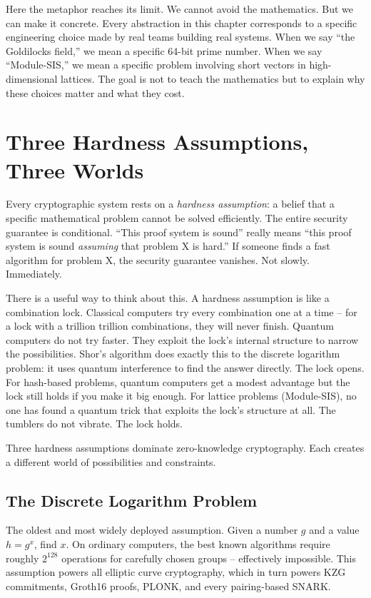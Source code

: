 \documentclass[
  11pt,
  openany]{report}
\begin{document}
Here the metaphor reaches its limit. We cannot avoid the mathematics. But we can
make it concrete. Every abstraction in this chapter corresponds to a specific
engineering choice made by real teams building real systems. When we say ``the
Goldilocks field,'' we mean a specific 64-bit prime number. When we say
``Module-SIS,'' we mean a specific problem involving short vectors in
high-dimensional lattices. The goal is not to teach the mathematics but to
explain why these choices matter and what they cost.

\section{Three Hardness Assumptions, Three
Worlds}\label{three-hardness-assumptions-three-worlds}

Every cryptographic system rests on a \emph{hardness assumption}: a belief that
a specific mathematical problem cannot be solved efficiently. The entire
security guarantee is conditional. ``This proof system is sound'' really means
``this proof system is sound \emph{assuming} that problem X is hard.'' If
someone finds a fast algorithm for problem X, the security guarantee vanishes.
Not slowly. Immediately.

There is a useful way to think about this. A hardness assumption is like a
combination lock. Classical computers try every combination one at a time -- for
a lock with a trillion trillion combinations, they will never finish. Quantum
computers do not try faster. They exploit the lock's internal structure to
narrow the possibilities. Shor's algorithm does exactly this to the discrete
logarithm problem: it uses quantum interference to find the answer directly. The
lock opens. For hash-based problems, quantum computers get a modest advantage
but the lock still holds if you make it big enough. For lattice problems
(Module-SIS), no one has found a quantum trick that exploits the lock's
structure at all. The tumblers do not vibrate. The lock holds.

Three hardness assumptions dominate zero-knowledge cryptography. Each creates a
different world of possibilities and constraints.

\subsection{The Discrete Logarithm
Problem}\label{the-discrete-logarithm-problem}

The oldest and most widely deployed assumption. Given a number \(g\) and a value
\(h = g^x\), find \(x\). On ordinary computers, the best known algorithms
require roughly \(2^{128}\) operations for carefully chosen groups --
effectively impossible. This assumption powers all elliptic curve cryptography,
which in turn powers KZG commitments, Groth16 proofs, PLONK, and every
pairing-based SNARK.
\end{document}
